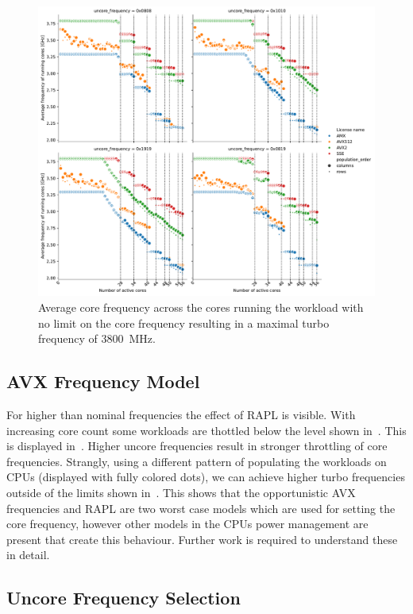 \begin{figure}[]
    \centering
    \includegraphics[width=0.8\columnwidth]{fig/avx-frequency-license-bands-without-isst-core-frequency-performance.pdf}
    \caption{\label{fig:avx-anomalies-performance}Average core frequency across the cores running the workload with no limit on the core frequency resulting in a maximal turbo frequency of \SI{3800}{\MHz}.}
\end{figure}


\subsection{AVX Frequency Model}
\label{sec:avx-anomalies-model}

For higher than nominal frequencies the effect of RAPL is visible.
With increasing core count some workloads are thottled below the level shown in~.
This is displayed in~.
Higher uncore frequencies result in stronger throttling of core frequencies.
Strangly, using a different pattern of populating the workloads on CPUs (displayed with fully colored dots), we can achieve higher turbo frequencies outside of the limits shown in~.
This shows that the opportunistic AVX frequencies and RAPL are two worst case models which are used for setting the core frequency, however other models in the CPUs power management are present that create this behaviour.
Further work is required to understand these in detail.

\subsection{Uncore Frequency Selection}
\label{sec:avx-anomalies-uncore-freqency}

